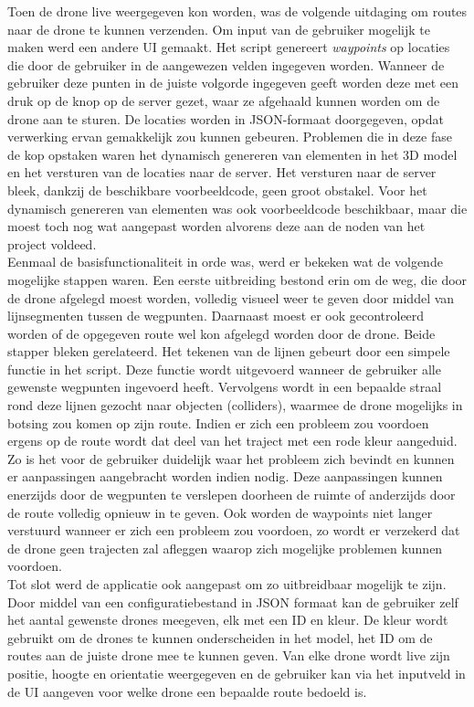 Toen de drone live weergegeven kon worden, was de volgende uitdaging om routes naar de drone te kunnen verzenden. Om input van de gebruiker mogelijk te maken werd een andere UI gemaakt. Het script genereert \textit{waypoints} op locaties die door de gebruiker in de aangewezen velden ingegeven worden. Wanneer de gebruiker deze punten in de juiste volgorde ingegeven geeft worden deze met een druk op de knop op de server gezet, waar ze afgehaald kunnen worden om de drone aan te sturen. De locaties worden in JSON-formaat doorgegeven, opdat verwerking ervan gemakkelijk zou kunnen gebeuren. Problemen die in deze fase de kop opstaken waren het dynamisch genereren van elementen in het 3D model en het versturen van de locaties naar de server. Het versturen naar de server bleek, dankzij de beschikbare voorbeeldcode, geen groot obstakel. Voor het dynamisch genereren van elementen was ook voorbeeldcode beschikbaar, maar die moest toch nog wat aangepast worden alvorens deze aan de noden van het project voldeed.\\

Eenmaal de basisfunctionaliteit in orde was, werd er bekeken wat de volgende mogelijke stappen waren. Een eerste uitbreiding bestond erin om de weg, die door de drone afgelegd moest worden, volledig visueel weer te geven door middel van lijnsegmenten tussen de wegpunten. Daarnaast moest er ook gecontroleerd worden of de opgegeven route wel kon afgelegd worden door de drone. Beide stapper bleken gerelateerd. Het tekenen van de lijnen gebeurt door een simpele functie in het script. Deze functie wordt uitgevoerd wanneer de gebruiker alle gewenste wegpunten ingevoerd heeft. Vervolgens wordt in een bepaalde straal rond deze lijnen gezocht naar objecten (colliders), waarmee de drone mogelijks in botsing zou komen op zijn route. Indien er zich een probleem zou voordoen ergens op de route wordt dat deel van het traject met een rode kleur aangeduid. Zo is het voor de gebruiker duidelijk waar het probleem zich bevindt en kunnen er aanpassingen aangebracht worden indien nodig. Deze aanpassingen kunnen enerzijds door de wegpunten te verslepen doorheen de ruimte of anderzijds door de route volledig opnieuw in te geven. Ook worden de waypoints niet langer verstuurd wanneer er zich een probleem zou voordoen, zo wordt er verzekerd dat de drone geen trajecten zal afleggen waarop zich mogelijke problemen kunnen voordoen.\\

Tot slot werd de applicatie ook aangepast om zo uitbreidbaar mogelijk te zijn.
Door middel van een configuratiebestand in JSON formaat kan de gebruiker zelf het aantal gewenste drones meegeven, elk met een ID en kleur.
De kleur wordt gebruikt om de drones te kunnen onderscheiden in het model, het ID om de routes aan de juiste drone mee te kunnen geven.
Van elke drone wordt live zijn positie, hoogte en orientatie weergegeven en de gebruiker kan via het inputveld in de UI aangeven voor welke drone een bepaalde route bedoeld is.